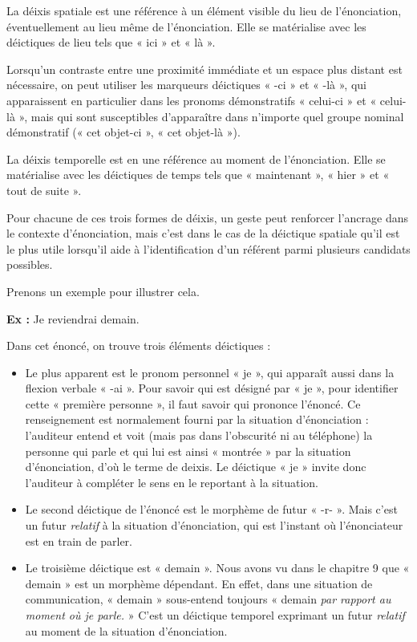 La déixis spatiale est une référence à un élément visible du lieu de l’énonciation, éventuellement au lieu même de l’énonciation. Elle se matérialise avec les déictiques de lieu tels que « ici » et « là ».

Lorsqu’un contraste entre une proximité immédiate et un espace plus distant est nécessaire, on peut utiliser les marqueurs déictiques « -ci » et « -là », qui apparaissent en particulier dans les pronoms démonstratifs « celui-ci » et « celui-là », mais qui sont susceptibles d’apparaître dans n’importe quel groupe nominal démonstratif (« cet objet-ci », « cet objet-là »).

La déixis temporelle est en une référence au moment de l’énonciation. Elle se matérialise avec les déictiques de temps tels que « maintenant », « hier » et « tout de suite ».

Pour chacune de ces trois formes de déixis, un geste peut renforcer l’ancrage dans le contexte d’énonciation, mais c’est dans le cas de la déictique spatiale qu’il est le plus utile lorsqu’il aide à l’identification d’un référent parmi plusieurs candidats possibles.

Prenons un exemple pour illustrer cela.

\textbf{Ex :} Je reviendrai demain.

Dans cet énoncé, on trouve trois éléments déictiques :
\begin{itemize}
\item Le plus apparent est le pronom personnel « je », qui apparaît aussi dans la flexion verbale « -ai ». Pour savoir qui est désigné par « je », pour identifier cette « première personne », il faut savoir qui prononce l’énoncé. Ce renseignement est normalement fourni par la situation d’énonciation : l’auditeur entend et voit (mais pas dans l’obscurité ni au téléphone) la personne qui parle et qui lui est ainsi « montrée » par la situation d’énonciation, d’où le terme de deixis. Le déictique « je » invite donc l’auditeur à compléter le sens en le reportant à la situation.
\item Le second déictique de l’énoncé est le morphème de futur « -r- ». Mais c’est un futur \textit{relatif} à la situation d’énonciation, qui est l’instant où l’énonciateur est en train de parler.
\item Le troisième déictique est « demain ». Nous avons vu dans le chapitre 9 que « demain » est un morphème dépendant. En effet, dans une situation de communication, « demain » sous-entend toujours « demain \textit{par rapport au moment où je parle.} » C’est un déictique temporel exprimant un futur \textit{relatif} au moment de la situation d’énonciation.
\end{itemize}

